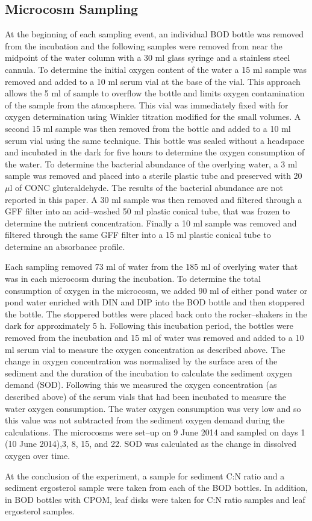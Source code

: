 \subsection{Microcosm Sampling}
At the beginning of each sampling event, an individual BOD bottle was removed from the incubation and the following samples were removed from near the midpoint of the water column with a 30 ml glass syringe and a stainless steel cannula. To determine the initial oxygen content of the water a 15 ml sample was removed and added to a 10 ml serum vial at the base of the vial. This approach allows the 5 ml of sample to overflow the bottle and limits oxygen contamination of the sample from the atmosphere. This vial was immediately fixed with for oxygen determination using Winkler titration \cite{CARPENTER_1965} modified for the small volumes. A second 15 ml sample was then removed from the bottle and added to a 10 ml serum vial using the same technique. This bottle was sealed without a headspace and incubated in the dark for five hours to determine the oxygen consumption of the water. To determine the bacterial abundance of the overlying water, a 3 ml sample was removed and placed into a sterile plastic tube and preserved with 20 $\mu$l of CONC gluteraldehyde. The results of the bacterial abundance are not reported in this paper. A 30 ml sample was then removed and filtered through a GFF filter into an acid--washed 50 ml plastic conical tube, that was frozen to determine the nutrient concentration. Finally a 10 ml sample was removed and filtered through the same GFF filter into a 15 ml plastic conical tube to determine an absorbance profile. 

Each sampling removed 73 ml of water from the 185 ml of overlying water that was in each microcosm during the incubation. To determine the total consumption of oxygen in the microcosm, we added 90 ml of either pond water or pond water enriched with DIN and DIP into the BOD bottle and then stoppered the bottle. The stoppered bottles were placed back onto the rocker--shakers in the dark for approximately 5 h. Following this incubation period, the bottles were removed from the incubation and 15 ml of water was removed and added to a 10 ml serum vial to measure the oxygen concentration as described above. The change in oxygen concentration was normalized by the surface area of the sediment and the duration of the incubation to calculate the sediment oxygen demand (SOD). Following this we measured the oxygen concentration (as described above) of the serum vials that had been incubated to measure the water oxygen consumption. The water oxygen consumption was very low and so this value was not subtracted from the sediment oxygen demand during the calculations. The microcosms were set--up on 9 June 2014 and sampled on days 1 (10 June 2014),3, 8, 15, and 22. SOD was calculated as the change in dissolved oxygen over time. 

At the conclusion of the experiment, a sample for sediment C:N ratio and a sediment ergosterol sample were taken from each of the BOD bottles. In addition, in BOD bottles with CPOM, leaf disks were taken for C:N ratio samples and leaf ergosterol samples. 